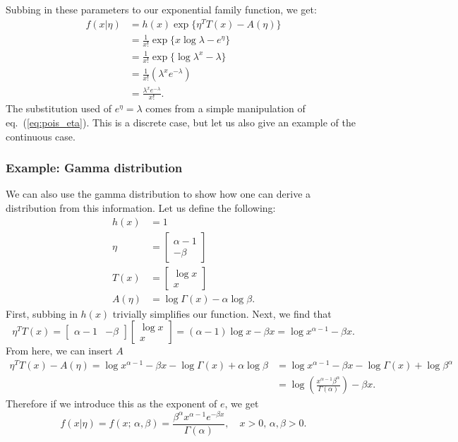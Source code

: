 \documentclass{article}
\begin{document}
Subbing in these parameters to our exponential family function, we get:
\begin{align}
    f(x\vert \eta) &= h(x)\exp{\{ \eta^T T(x)-A(\eta) \}} \\
    &= \frac{1}{x!} \exp{\{x \log{\lambda} - e^\eta\}} \\
    &= \frac{1}{x!} \exp{\{\log{\lambda^x} - \lambda \}} \\
    &= \frac{1}{x!}(\lambda^x e^{-\lambda}) \\
    &= \frac{\lambda^x e^{-\lambda}}{x!}.
\end{align}
The substitution used of $e^\eta = \lambda$ comes from a simple manipulation of eq.~(\ref{eq:pois_eta}). This is a discrete case, but let us also give an example of the continuous case.

\subsubsection{Example: Gamma distribution}
We can also use the gamma distribution to show how one can derive a distribution from this information. Let us define the following:
\begin{align}
    h(x) &= 1 \\
    \eta &= \begin{bmatrix} \alpha-1 \\ -\beta \end{bmatrix} \\
    T(x) &= \begin{bmatrix} \log{x} \\ x \end{bmatrix} \\
    A(\eta) &= \log{\Gamma(x)} -\alpha\log{\beta}.
\end{align}
First, subbing in $h(x)$ trivially simplifies our function. Next, we find that
\begin{equation}
    \eta^T T(x) = \begin{bmatrix} \alpha-1 & -\beta \end{bmatrix}\begin{bmatrix} \log{x} \\ x \end{bmatrix} = (\alpha-1)\log{x} - \beta x = \log{x^{\alpha-1}}-\beta{x}.
\end{equation}
From here, we can insert $A$
\begin{align}
    \eta^T T(x)-A(\eta) = \log{x^{\alpha-1}}-\beta{x} - \log{\Gamma(x)} +\alpha\log{\beta} &=  \log{x^{\alpha-1}}-\beta{x} - \log{\Gamma(x)} + \log{\beta^\alpha}\\
    &= \log{\left(\frac{ x^{\alpha-1}\beta^\alpha}{\Gamma(\alpha)} \right)}-\beta x.
\end{align}
Therefore if we introduce this as the exponent of $e$, we get
\begin{equation}
    f(x\vert\eta) = f(x;\,\alpha,\beta) = \frac{\beta^\alpha x^{\alpha-1}e^{-\beta x}}{\Gamma(\alpha)},\quad x>0,\,\alpha,\beta>0.
\end{equation}
\end{document}
